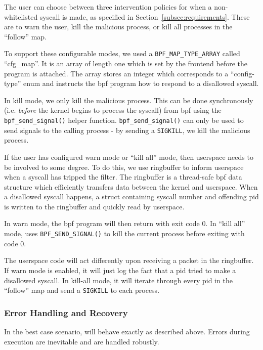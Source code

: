 The user can choose between three intervention policies for when a
non-whitelisted syscall is made, as specified in 
Section~\ref{subsec:requirements}. These are to warn the user, kill the
malicious process, or kill all processes in the ``follow'' map.

To support these configurable modes, we used a \texttt{BPF\_MAP\_TYPE\_ARRAY}
called ``cfg\_map''. It is an array of length one which is set by the frontend
before the program is attached. The array stores an integer which corresponds to
a ``config-type'' enum and instructs the \ac{bpf} program how to respond to a
disallowed syscall.

In kill mode, we only kill the malicious process. This can be done synchronously
(i.e. \textit{before} the kernel begins to process the syscall) from \ac{bpf}
using the \texttt{bpf\_send\_signal()} helper function. 
\texttt{bpf\_send\_signal()} can only be used to send signals to the calling
process - by sending a \texttt{SIGKILL}, we kill the malicious process.

If the user has configured warn mode or ``kill all'' mode, then userspace needs
to be involved to some degree. To do this, we use  ringbuffer to inform
userspace when a syscall has tripped the filter. The ringbuffer is a thread-safe
\ac{bpf} data structure which efficiently transfers data between the kernel and
userspace. When a disallowed syscall happens, a struct containing syscall
number and offending \ac{pid} is written to the ringbuffer and quickly read by
userspace.


In warn mode, the \ac{bpf} program will then return with exit code 0. In ``kill
all'' mode, \af uses \texttt{BPF\_SEND\_SIGNAL()} to kill the current process
before exiting with code 0.

The userspace code will act differently upon receiving a packet in the
ringbuffer. If warn mode is enabled, it will just log the fact that a \ac{pid}
tried to make a disallowed syscall. In kill-all mode, it will iterate through
every \ac{pid} in the ``follow'' map and send a \texttt{SIGKILL} to each
process.

\subsubsection{Error Handling and Recovery}\label{subsubsec:err-handling}

In the best case scenario, \af will behave exactly as described above. Errors
during execution are inevitable and are handled robustly. 


